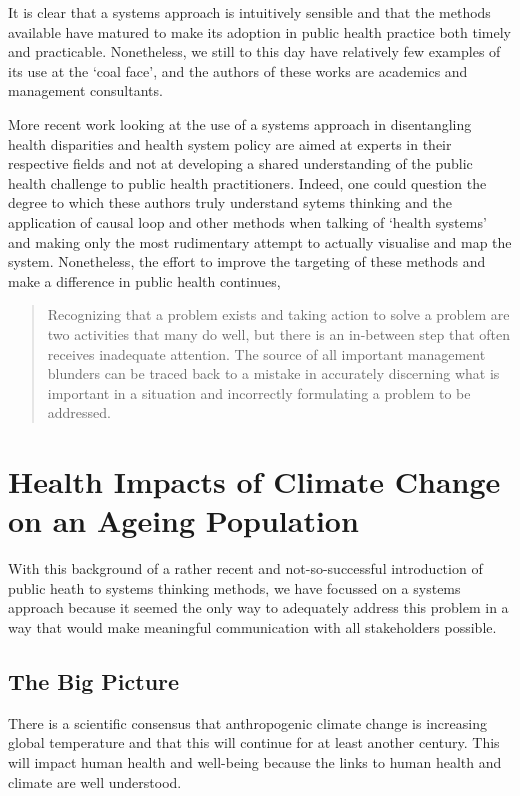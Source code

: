 It is clear that a systems approach is intuitively sensible and that the methods available have matured to make its adoption in public health practice both timely and practicable.\cite{Trochim2006, Homer2006} Nonetheless, we still to this day have relatively few examples of its use at the `coal face', and the authors of these works are academics and management consultants.

More recent work looking at the use of a systems approach in disentangling health disparities and health system policy are aimed at experts in their respective fields and not at developing a shared understanding of the public health challenge to public health practitioners.\cite{Roux2011} Indeed, one could question the degree to which these authors truly understand sytems thinking and the application of causal loop and other methods when talking of `health systems' and making only the most rudimentary attempt to actually visualise and map the system.\cite{BoschCapblanch2012} Nonetheless, the effort to improve the targeting of these methods and make a difference in public health continues,

\begin{quotation}
Recognizing that a problem exists and taking action to solve a problem are two activities that many do well, but there is an in-between step that often receives inadequate attention. The source of all important management blunders can be traced back to a mistake in accurately discerning what is important in a situation and incorrectly formulating a problem to be addressed.\cite{Canyon2013}
\end{quotation}

\section{Health Impacts of Climate Change on an Ageing Population}

With this background of a rather recent and not-so-successful introduction of public heath to systems thinking methods, we have focussed on a systems approach because it seemed the only way to adequately address this problem in a way that would make meaningful communication with all stakeholders possible.

\subsection{The Big Picture}
There is a scientific consensus that anthropogenic climate change is increasing global temperature and that this will continue for at least another century. This will impact human health and well-being because the links to human health and climate are well understood.

